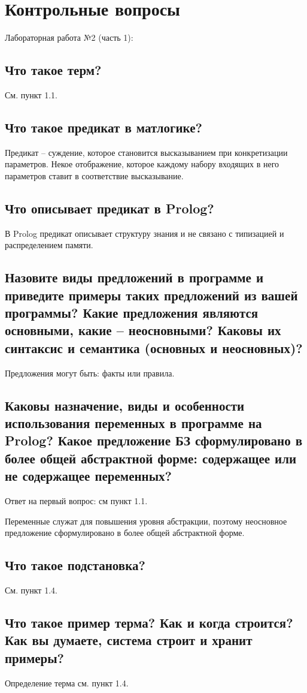 \chapter{Контрольные вопросы}
Лабораторная работа  №2 (часть 1):
\section{Что такое терм?} 
См. пункт 1.1.
\section{Что такое предикат в матлогике?}
Предикат -- суждение, которое становится высказыванием при конкретизации параметров. Некое отображение, которое каждому набору входящих в него параметров ставит в соответствие высказывание.
\section{Что описывает предикат в Prolog?}
В Prolog предикат описывает структуру знания и не связано с типизацией и распределением памяти.
\section{Назовите виды предложений в программе и приведите примеры таких предложений из вашей программы? Какие предложения являются основными, какие -- неосновными? Каковы их синтаксис и семантика (основных и неосновных)?}
Предложения могут быть: факты или правила.

\section{Каковы назначение, виды и особенности использования переменных в программе на Prolog? Какое предложение БЗ сформулировано в более общей абстрактной форме: содержащее или не содержащее переменных?}
Ответ на первый вопрос: см пункт 1.1.

Переменные служат для повышения уровня абстракции, поэтому неосновное предложение сформулировано в более общей абстрактной форме.
\section{Что такое подстановка?}
См. пункт 1.4.
\section{Что такое пример терма? Как и когда строится? Как вы думаете, система строит и хранит примеры?}
Определение терма см. пункт 1.4. 

